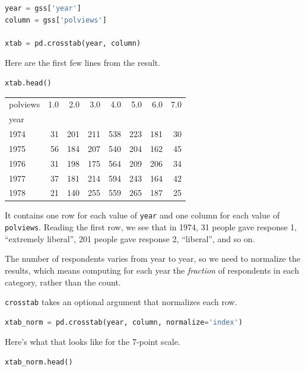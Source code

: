 \begin{lstlisting}[language=Python,style=source]
year = gss['year']
column = gss['polviews']

xtab = pd.crosstab(year, column)
\end{lstlisting}

Here are the first few lines from the result.

\begin{lstlisting}[language=Python,style=source]
xtab.head()
\end{lstlisting}

\begin{tabular}{lrrrrrrr}
\toprule
polviews &  1.0 &  2.0 &  3.0 &  4.0 &  5.0 &  6.0 &  7.0 \\
year &      &      &      &      &      &      &      \\
\midrule
1974 &   31 &  201 &  211 &  538 &  223 &  181 &   30 \\
1975 &   56 &  184 &  207 &  540 &  204 &  162 &   45 \\
1976 &   31 &  198 &  175 &  564 &  209 &  206 &   34 \\
1977 &   37 &  181 &  214 &  594 &  243 &  164 &   42 \\
1978 &   21 &  140 &  255 &  559 &  265 &  187 &   25 \\
\bottomrule
\end{tabular}

It contains one row for each value of \passthrough{\lstinline!year!} and
one column for each value of \passthrough{\lstinline!polviews!}. Reading
the first row, we see that in 1974, 31 people gave response 1,
``extremely liberal'', 201 people gave response 2, ``liberal'', and so
on.

The number of respondents varies from year to year, so we need to
normalize the results, which means computing for each year the
\emph{fraction} of respondents in each category, rather than the count.

\passthrough{\lstinline!crosstab!} takes an optional argument that
normalizes each row.

\begin{lstlisting}[language=Python,style=source]
xtab_norm = pd.crosstab(year, column, normalize='index')
\end{lstlisting}

Here's what that looks like for the 7-point scale.

\begin{lstlisting}[language=Python,style=source]
xtab_norm.head()
\end{lstlisting}

